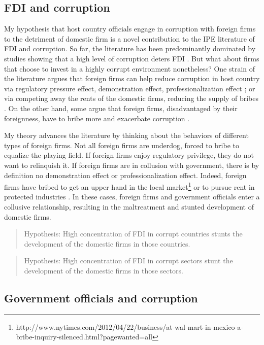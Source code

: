 \documentclass[12pt]{article}
\begin{document}
\subsection{FDI and corruption}

My hypothesis that host country officials engage in corruption with foreign firms to the detriment of domestic firm is a novel contribution to the IPE literature of FDI and corruption. So far, the literature has been predominantly dominated by studies showing that a high level of corruption deters FDI \citep{Wei2000, Hakkala2008, Al-Sadig2009}. But what about firms that choose to invest in a highly corrupt environment nonetheless? One strain of the literature argues that foreign firms can help reduce corruption in host country via regulatory pressure effect, demonstration effect, professionalization effect \citep{Kwok2006}; or via competing away the rents of the domestic firms, reducing the supply of bribes \citep{Sandholtz2003}. On the other hand, some argue that foreign firms, disadvantaged by their foreignness, have to bribe more and exacerbate corruption \citep{Hellman2002}.

My theory advances the literature by thinking about the behaviors of different types of foreign firms. Not all foreign firms are underdog, forced to bribe to equalize the playing field. If foreign firms enjoy regulatory privilege, they do not want to relinquish it. If foreign firms are in collusion with government, there is by definition no demonstration effect or professionalization effect. Indeed, foreign firms have bribed to get an upper hand in the local market\footnote{http://www.nytimes.com/2012/04/22/business/at-wal-mart-in-mexico-a-bribe-inquiry-silenced.html?pagewanted=all} or to pursue rent in protected industries \citep{Malesky2015}. In these cases, foreign firms and government officials enter a collusive relationship, resulting in the maltreatment and stunted development of domestic firms.

\begin{quote}
Hypothesis: High concentration of FDI in corrupt countries stunts the development of the domestic firms in those countries.
\end{quote}

\begin{quote}
Hypothesis: High concentration of FDI in corrupt sectors stunt the development of the domestic firms in those sectors.
\end{quote}

\subsection{Government officials and corruption}
\end{document}

